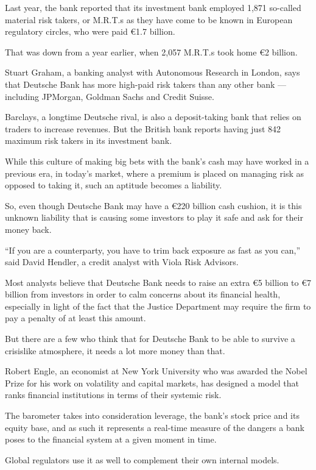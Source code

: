 Last year, the bank reported that its investment bank employed 1,871
so-called material risk takers, or M.R.T.s as they have come to be known
in European regulatory circles, who were paid €1.7 billion.

That was down from a year earlier, when 2,057 M.R.T.s took home €2
billion.

Stuart Graham, a banking analyst with Autonomous Research in London,
says that Deutsche Bank has more high-paid risk takers than any other
bank --- including JPMorgan, Goldman Sachs and Credit Suisse.

Barclays, a longtime Deutsche rival, is also a deposit-taking bank that
relies on traders to increase revenues. But the British bank reports
having just 842 maximum risk takers in its investment bank.

While this culture of making big bets with the bank's cash may have
worked in a previous era, in today's market, where a premium is placed
on managing risk as opposed to taking it, such an aptitude becomes a
liability.

So, even though Deutsche Bank may have a €220 billion cash cushion, it
is this unknown liability that is causing some investors to play it safe
and ask for their money back.

``If you are a counterparty, you have to trim back exposure as fast as
you can,'' said David Hendler, a credit analyst with Viola Risk
Advisors.

Most analysts believe that Deutsche Bank needs to raise an extra €5
billion to €7 billion from investors in order to calm concerns about its
financial health, especially in light of the fact that the Justice
Department may require the firm to pay a penalty of at least this
amount.

But there are a few who think that for Deutsche Bank to be able to
survive a crisislike atmosphere, it needs a lot more money than that.

Robert Engle, an economist at New York University who was awarded the
Nobel Prize for his work on volatility and capital markets, has designed
a model that ranks financial institutions in terms of their systemic
risk.

The barometer takes into consideration leverage, the bank's stock price
and its equity base, and as such it represents a real-time measure of
the dangers a bank poses to the financial system at a given moment in
time.

Global regulators use it as well to complement their own internal
models.

